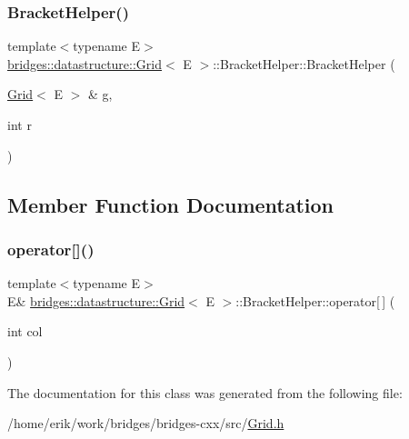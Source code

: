 \subsubsection{\texorpdfstring{Bracket\+Helper()}{BracketHelper()}}
{\footnotesize\ttfamily template$<$typename E$>$ \\
\hyperlink{classbridges_1_1datastructure_1_1_grid}{bridges\+::datastructure\+::\+Grid}$<$ E $>$\+::Bracket\+Helper\+::\+Bracket\+Helper (\begin{DoxyParamCaption}\item[{\hyperlink{classbridges_1_1datastructure_1_1_grid}{Grid}$<$ E $>$ \&}]{g,  }\item[{int}]{r }\end{DoxyParamCaption})\hspace{0.3cm}{\ttfamily [inline]}}



\subsection{Member Function Documentation}
\mbox{\label{classbridges_1_1datastructure_1_1_grid_1_1_bracket_helper_a4cf644b40ea05506e98f7f0863245ecb}} 
\subsubsection{\texorpdfstring{operator[]()}{operator[]()}}
{\footnotesize\ttfamily template$<$typename E$>$ \\
E\& \hyperlink{classbridges_1_1datastructure_1_1_grid}{bridges\+::datastructure\+::\+Grid}$<$ E $>$\+::Bracket\+Helper\+::operator\mbox{[}$\,$\mbox{]} (\begin{DoxyParamCaption}\item[{int}]{col }\end{DoxyParamCaption})\hspace{0.3cm}{\ttfamily [inline]}}



The documentation for this class was generated from the following file\+:\begin{DoxyCompactItemize}
\item 
/home/erik/work/bridges/bridges-\/cxx/src/\hyperlink{_grid_8h}{Grid.\+h}\end{DoxyCompactItemize}
